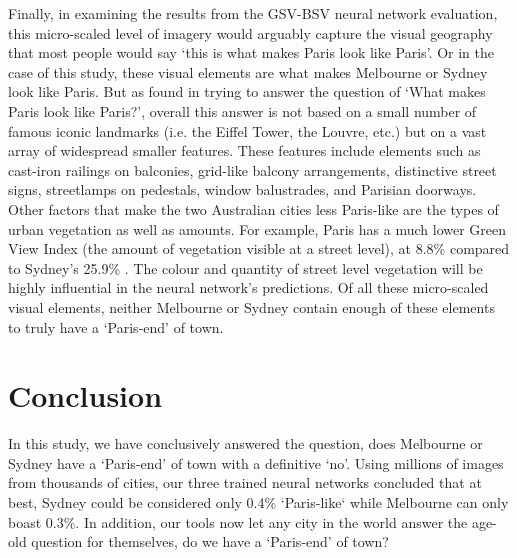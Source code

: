\documentclass[10pt,letterpaper]{article}
\begin{document}


Finally, in examining the results from the GSV-BSV neural network evaluation, this micro-scaled level of imagery would arguably capture the visual geography that most people would say `this is what makes Paris look like Paris'. Or in the case of this study, these visual elements are what makes Melbourne or Sydney look like Paris. But as \cite{Doersch2012} found in trying to answer the question of `What makes Paris look like Paris?', overall this answer is not based on a small number of famous iconic landmarks (i.e. the Eiffel Tower, the Louvre, etc.) but on a vast array of widespread smaller features. These features include elements such as cast-iron railings on balconies, grid-like balcony arrangements, distinctive street signs, streetlamps on pedestals, window balustrades, and Parisian doorways. Other factors that make the two Australian cities less Paris-like are the types of urban vegetation as well as amounts. For example, Paris has a much lower Green View Index (the amount of vegetation visible at a street level), at 8.8\% compared to Sydney's 25.9\% \cite{Li2015}. The colour and quantity of street level vegetation will be highly influential in the neural network's predictions. Of all these micro-scaled visual elements, neither Melbourne or Sydney contain enough of these elements to truly have a `Paris-end' of town.



\section*{Conclusion}\label{sec:conclusion}

In this study, we have conclusively answered the question, does Melbourne or Sydney have a `Paris-end' of town with a definitive `no'. Using millions of images from thousands of cities, our three trained neural networks concluded that at best, Sydney could be considered only 0.4\% `Paris-like` while Melbourne can only boast 0.3\%. In addition, our tools now let any city in the world answer the age-old question for themselves, do we have a `Paris-end' of town?
\end{document}
